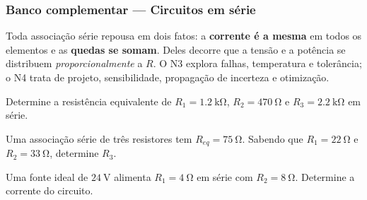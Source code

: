 
\subsubsection*{Banco complementar --- Circuitos em série}

\begin{atencao}
Toda associação série repousa em dois fatos: a \textbf{corrente é a mesma} em
todos os elementos e as \textbf{quedas se somam}. Deles decorre que a tensão e
a potência se distribuem \emph{proporcionalmente} a $R$. O N3 explora falhas,
temperatura e tolerância; o N4 trata de projeto, sensibilidade, propagação de
incerteza e otimização.
\end{atencao}

\blocofixacao

\begin{questao}[1]{}
Determine a resistência equivalente de $R_1=\SI{1.2}{\kilo\ohm}$,
$R_2=\SI{470}{\ohm}$ e $R_3=\SI{2.2}{\kilo\ohm}$ em série.
\end{questao}

\begin{questao}[1]{}
Uma associação série de três resistores tem $R_{eq}=\SI{75}{\ohm}$. Sabendo que
$R_1=\SI{22}{\ohm}$ e $R_2=\SI{33}{\ohm}$, determine $R_3$.
\end{questao}

\begin{questao}[1]{}
Uma fonte ideal de $\SI{24}{\volt}$ alimenta $R_1=\SI{4}{\ohm}$ em série com
$R_2=\SI{8}{\ohm}$. Determine a corrente do circuito.
\end{questao}

